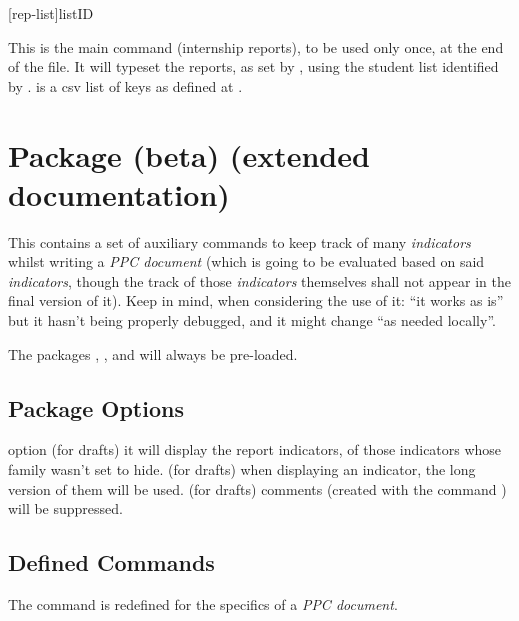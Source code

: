 \documentclass[article,nogeometry,english,tocdepth=3,secdepth=3]{ufrgscca} %
\begin{document}
\begin{codedescribe}{\internshipreports}
    \begin{codesyntax}%
        \tsmacro{\internshipreports}[rep-list]{listID}
    \end{codesyntax}
    This is the main command (internship reports), to be used only once, at the end of the file. It will typeset the reports, as set by \tsmacro{\setreports}{}, using the student list identified by .
     is a csv list of keys as defined at .
\end{codedescribe}

\section{ Package (beta) (extended documentation)}
This contains a set of auxiliary commands to keep track of many \emph{indicators} whilst writing  a \emph{PPC document} (which is going to be evaluated based on said \emph{indicators}, though the track of those \emph{indicators} themselves shall not appear in the final version of it). Keep in mind, when considering the use of it: “it works as is” but it hasn't being properly debugged, and it might change “as needed locally”.

The packages , ,  and  will always be pre-loaded.

\subsection{Package Options}
\begin{describelist}{option}
 { (for drafts) it will display the report indicators, of those indicators whose family wasn't set to hide.}
 { (for drafts) when displaying an indicator, the long version of them will be used.}
 { (for drafts) comments (created with the command \tsmacro{\comment}) will be suppressed.}
\end{describelist}

\subsection{Defined Commands}
\begin{codedescribe}{\maketitle}
    \begin{codesyntax}%
        \tsmacro{\maketitle}{}
    \end{codesyntax}
The command \tsmacro{\maketitle}{} is redefined for the specifics of a \emph{PPC document}.
\end{codedescribe}
\end{document}
